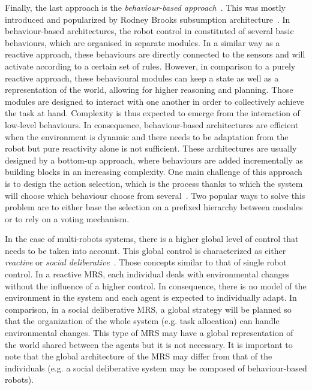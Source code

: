     Finally, the last approach is the \emph{behaviour-based approach}~\parencite{Arkin1998}. This was mostly introduced and popularized by Rodney Brooks subsumption architecture~\parencite{Brooks1986}. In behaviour-based architectures, the robot control in constituted of several basic behaviours, which are organised in separate modules. In a similar way as a reactive approach, these behaviours are directly connected to the sensors and will activate according to a certain set of rules. However, in comparison to a purely reactive approach, these behavioural modules can keep a state as well as a representation of the world, allowing for higher reasoning and planning. Those modules are designed to interact with one another in order to collectively achieve the task at hand. Complexity is thus expected to emerge from the interaction of low-level behaviours. In consequence, behaviour-based architectures are efficient when the environment is dynamic and there needs to be adaptation from the robot but pure reactivity alone is not sufficient. These architectures are usually designed by a bottom-up approach, where behaviours are added incrementally as building blocks in an increasing complexity. One main challenge of this approach is to design the action selection, which is the process thanks to which the system will choose which behaviour choose from several~\parencite{Pirjanian2000}. Two popular ways to solve this problem are to either base the selection on a prefixed hierarchy between modules or to rely on a voting mechanism.


    In the case of multi-robots systems, there is a higher global level of control that needs to be taken into account. This global control is characterized as either \emph{reactive} or \emph{social deliberative}~\parencite{Iocchi2001, Carpin2001}. Those concepts similar to that of single robot control. In a reactive MRS, each individual deals with environmental changes without the influence of a higher control. In consequence, there is no model of the environment in the system and each agent is expected to individually adapt. In comparison, in a social deliberative MRS, a global strategy will be planned so that the organization of the whole system (e.g. task allocation) can handle environmental changes. This type of MRS may have a global representation of the world shared between the agents but it is not necessary. It is important to note that the global architecture of the MRS may differ from that of the individuals (e.g. a social deliberative system may be composed of behaviour-based robots).

